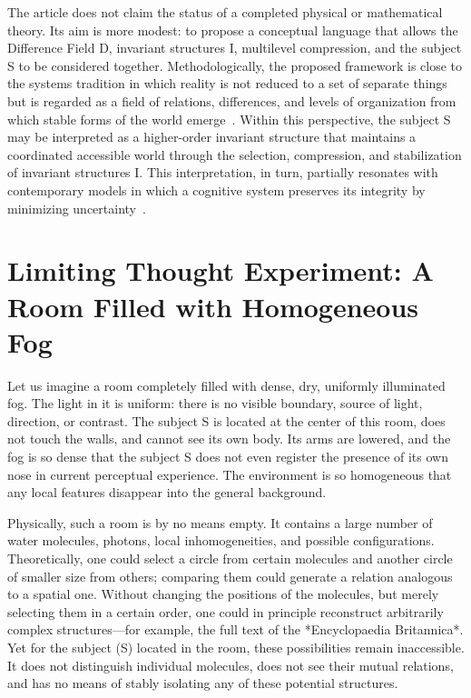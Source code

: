 \documentclass[aps,prd,onecolumn,nofootinbib,superscriptaddress]{revtex4-2} %
\begin{document}
    The article does not claim the status of a completed physical or mathematical theory. Its aim is more modest: to propose a conceptual language that allows the Difference Field D, invariant structures I, multilevel compression, and the subject S to be considered together. Methodologically, the proposed framework is close to the systems tradition in which reality is not reduced to a set of separate things but is regarded as a field of relations, differences, and levels of organization from which stable forms of the world emerge~\cite{Bateson1972}. Within this perspective, the subject S may be interpreted as a higher-order invariant structure that maintains a coordinated accessible world through the selection, compression, and stabilization of invariant structures I. This interpretation, in turn, partially resonates with contemporary models in which a cognitive system preserves its integrity by minimizing uncertainty~\cite{Friston2010}.


    \section{Limiting Thought Experiment: A Room Filled with Homogeneous Fog}
    Let us imagine a room completely filled with dense, dry, uniformly illuminated fog. The light in it is uniform: there is no visible boundary, source of light, direction, or contrast. The subject S is located at the center of this room, does not touch the walls, and cannot see its own body. Its arms are lowered, and the fog is so dense that the subject S does not even register the presence of its own nose in current perceptual experience. The environment is so homogeneous that any local features disappear into the general background.

    Physically, such a room is by no means empty. It contains a large number of water molecules, photons, local inhomogeneities, and possible configurations. Theoretically, one could select a circle from certain molecules and another circle of smaller size from others; comparing them could generate a relation analogous to a spatial one. Without changing the positions of the molecules, but merely selecting them in a certain order, one could in principle reconstruct arbitrarily complex structures—for example, the full text of the *Encyclopaedia Britannica*. Yet for the subject (S) located in the room, these possibilities remain inaccessible. It does not distinguish individual molecules, does not see their mutual relations, and has no means of stably isolating any of these potential structures.
\end{document}
